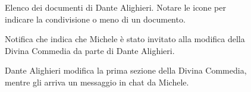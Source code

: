 \begin{center}
	\begin{figure}[ht!]
		\caption{Elenco dei documenti di Dante Alighieri. Notare le icone per indicare la condivisione o meno di un documento.}
	\end{figure}

	\begin{figure}[ht!]
		\caption{Notifica che indica che Michele è stato invitato alla modifica della Divina Commedia da parte di Dante Alighieri.}
	\end{figure}

	\begin{figure}[ht!]
		\caption{Dante Alighieri modifica la prima sezione della Divina Commedia, mentre gli arriva un messaggio in chat da Michele.}
	\end{figure}
\end{center}

\newpage
